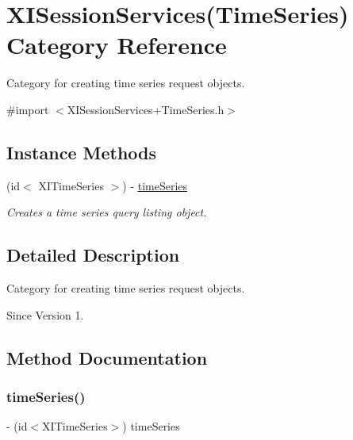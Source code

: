 \hypertarget{category_x_i_session_services_07_time_series_08}{}\section{X\+I\+Session\+Services(Time\+Series) Category Reference}
\label{category_x_i_session_services_07_time_series_08}


Category for creating time series request objects.  




{\ttfamily \#import $<$X\+I\+Session\+Services+\+Time\+Series.\+h$>$}

\subsection*{Instance Methods}
\begin{DoxyCompactItemize}
\item 
(id$<$ X\+I\+Time\+Series $>$) -\/ \hyperlink{category_x_i_session_services_07_time_series_08_a808e154dc998adc6557ac7e5a7693c60}{time\+Series}
\begin{DoxyCompactList}\small\item\em Creates a time series query listing object. \end{DoxyCompactList}\end{DoxyCompactItemize}


\subsection{Detailed Description}
Category for creating time series request objects. 

\begin{DoxySince}{Since}
Version 1. 
\end{DoxySince}


\subsection{Method Documentation}
\hypertarget{category_x_i_session_services_07_time_series_08_a808e154dc998adc6557ac7e5a7693c60}{}\label{category_x_i_session_services_07_time_series_08_a808e154dc998adc6557ac7e5a7693c60} 
\subsubsection{\texorpdfstring{time\+Series()}{timeSeries()}}
{\footnotesize\ttfamily -\/ (id$<$X\+I\+Time\+Series$>$) time\+Series \begin{DoxyParamCaption}{ }\end{DoxyParamCaption}}



